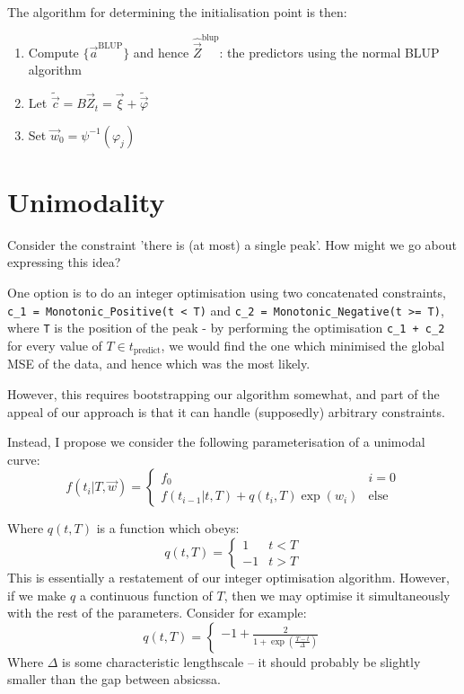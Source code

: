 \documentclass[]{article}
\begin{document}
{			The algorithm for determining the initialisation point is then:
			\begin{enumerate}
				\item Compute $\{ \vec{a}^\text{BLUP} \}$ and hence $\hat{\vec{Z}}^\text{blup}$: the predictors using the normal BLUP algorithm
				\item Let $\tilde{\vec{c}} = B \vec{Z}_t = \vec{\xi} + \tilde{\vec{\varphi}}$
				\item Set $\vec{w}_0 = \psi^{-1}\left(\varphi_j\right)$
			\end{enumerate}
			}
	
	\newpage
	\section{Unimodality}

		Consider the constraint 'there is (at most) a single peak'. How might we go about expressing this idea?

		One option is to do an integer optimisation using two concatenated constraints, \verb|c_1 = Monotonic_Positive(t < T)| and \verb|c_2 = Monotonic_Negative(t >= T)|, where \verb|T| is the position of the peak - by performing the optimisation \verb|c_1 + c_2| for every value of $T \in {t_\text{predict}}$, we would find the one which minimised the global MSE of the data, and hence which was the most likely. 
		
		However, this requires bootstrapping our algorithm somewhat, and part of the appeal of our approach is that it can handle (supposedly) arbitrary constraints. 

		Instead, I propose we consider the following parameterisation of a unimodal curve:
		\begin{equation}
			f(t_i | T, \vec{w}) = \begin{cases} f_0 & i = 0 \\ f(t_{i-1}|t,T) + q(t_i,T) \exp(w_i) & \text{else}\end{cases}
		\end{equation}
			
		Where $q(t,T)$ is a function which obeys:
		\begin{equation}
			q(t,T) = \begin{cases}
				1 & t < T
				\\
				 -1 & t > T
			\end{cases}
		\end{equation}
		This is essentially a restatement of our integer optimisation algorithm. However, if we make $q$ a continuous function of $T$, then we may optimise it simultaneously with the rest of the parameters. Consider for example:
		\begin{equation}
			q(t,T) = \begin{cases}
				-1 + \frac{2}{1 + \exp\left(\frac{T - t}{\Delta}\right)}
			\end{cases}
		\end{equation} 
		Where $\Delta$ is some characteristic lengthscale -- it should probably be slightly smaller than the gap between absicssa.
\end{document}
